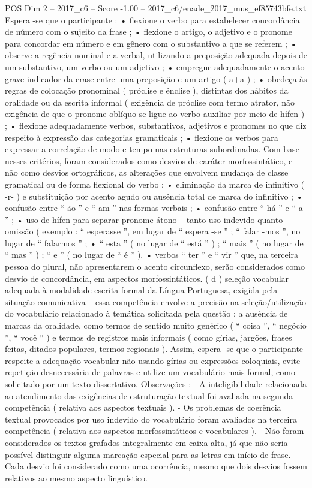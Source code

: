 \begin{textsample}{POS Dim 2 – 2017\_c6 – Score -1.00 – 2017\_c6/enade\_2017\_mus\_ef85743bfe.txt}
Espera -se que o participante : • flexione o verbo para estabelecer concordância de número com o sujeito da frase ; • flexione o artigo, o adjetivo e o pronome para concordar em número e em gênero com o substantivo a que se referem ; • observe a regência nominal e a verbal, utilizando a preposição adequada depois de um substantivo, um verbo ou um adjetivo ; • empregue adequadamente o acento grave indicador da crase entre uma preposição e um artigo ( a+a ) ; • obedeça às regras de colocação pronominal ( próclise e ênclise ), distintas dos hábitos da oralidade ou da escrita informal ( exigência de próclise com termo atrator, não exigência de que o pronome oblíquo se ligue ao verbo auxiliar por meio de hífen ) ; • flexione adequadamente verbos, substantivos, adjetivos e pronomes no que diz respeito à expressão das categorias gramaticais ; • flexione os verbos para expressar a correlação de modo e tempo nas estruturas subordinadas.
Com base nesses critérios, foram considerados como desvios de caráter morfossintático, e não como desvios ortográficos, as alterações que envolvem mudança de classe gramatical ou de forma flexional do verbo : • eliminação da marca de infinitivo ( -r- ) e substituição por acento agudo ou ausência total de marca do infinitivo ; • confusão entre “ ão ” e “ am ” nas formas verbais ; • confusão entre “ há ” e “ a ” ; • uso de hífen para separar pronome átono – tanto uso indevido quanto omissão ( exemplo : “ esperasse ”, em lugar de “ espera -se ” ; “ falar -mos ”, no lugar de “ falarmos ” ; • “ esta ” ( no lugar de “ está ” ) ; “ mais ” ( no lugar de “ mas ” ) ; “ e ” ( no lugar de “ é ” ). • verbos “ ter ” e “ vir ” que, na terceira pessoa do plural, não apresentarem o acento circunflexo, serão considerados como desvio de concordância, em aspectos morfossintáticos. ( d ) seleção vocabular adequada à modalidade escrita formal da Língua Portuguesa, exigida pela situação comunicativa – essa competência envolve a precisão na seleção/utilização do vocabulário relacionado à temática solicitada pela questão ; a ausência de marcas da oralidade, como termos de sentido muito genérico ( “ coisa ”, “ negócio ”, “ você ” ) e termos de registros mais informais ( como gírias, jargões, frases feitas, ditados populares, termos regionais ).
Assim, espera -se que o participante respeite a adequação vocabular não usando gírias ou expressões coloquiais, evite repetição desnecessária de palavras e utilize um vocabulário mais formal, como solicitado por um texto dissertativo.
Observações : - A inteligibilidade relacionada ao atendimento das exigências de estruturação textual foi avaliada na segunda competência ( relativa aos aspectos textuais ). - Os problemas de coerência textual provocados por uso indevido do vocabulário foram avaliados na terceira competência ( relativa aos aspectos morfossintáticos e vocabulares ). - Não foram considerados os textos grafados integralmente em caixa alta, já que não seria possível distinguir alguma marcação especial para as letras em início de frase. - Cada desvio foi considerado como uma ocorrência, mesmo que dois desvios fossem relativos ao mesmo aspecto linguístico.

\end{textsample}
